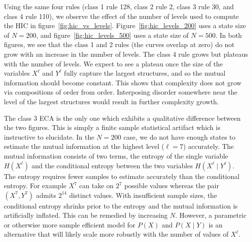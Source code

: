 Using the same four rules (class 1 rule 128, class 2 rule 2, class 3 rule 30,
and class 4 rule 110), we observe the effect of the number of levels used to
compute the HIC in figure~\ref{fig:hic_vs_levels}.
Figure~\ref{fig:hic_levels_200} uses a state size of $N\!=\!200$, and
figure~\ref{fig:hic_levels_500} uses a state size of $N\!=\!500$. In both
figures, we see that the class 1 and 2 rules (the curves overlap at zero) do
not grow with an increase in the number of levels. The class 4 rule grows but
plateaus with the number of levels. We expect to see a plateau once the size of
the variables $X^\ell$ and $Y^\ell$ fully capture the largest structures, and
so the mutual information should become constant.  This shows that complexity
does not grow via compositions of order from order.  Interposing disorder
somewhere near the level of the largest structures would result in further
complexity growth.

The class 3 ECA is the only one which exhibits a qualitative difference between
the two figures. This is simply a finite sample statistical artifact which is
instructive to elucidate. In the $N\!=\!200$ case, we do not have enough states to
estimate the mutual information at the highest level ($\ell\!=\!7$) accurately.
The mutual information consists of two terms, the entropy of the single
variable $H(X^\ell)$ and the conditional entropy between the two variables
$H(X^\ell \mid Y^\ell)$. The entropy requires fewer samples to estimate
accurately than the conditional entropy. For example $X^7$ can take on $2^7$
possible values whereas the pair $(X^7, Y^7)$ admits $2^{14}$ distinct values.
With insufficient sample sizes, the conditional entropy shrinks prior to the
entropy and the mutual information is artificially inflated. This can be
remedied by increasing $N$. However, a parametric or otherwise more sample
efficient model for $P(X)$ and $P(X \mid Y)$ is an alternative that will likely
scale more robustly with the number of values of $X^\ell$.
